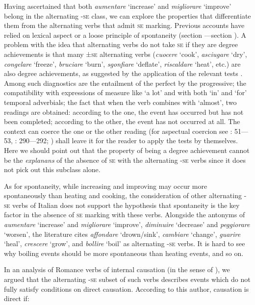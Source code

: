 \documentclass[output=paper,colorlinks,citecolor=brown
]{langscibook}
\begin{document}
Having ascertained that both \textit{aumentare} ‘increase’ and \textit{migliorare} ‘improve’ belong in the alternating -\textsc{se} class, we can explore the properties that differentiate them from the alternating verbs that admit \textsc{se} marking. Previous accounts have relied on lexical aspect or a loose principle of spontaneity (section —section ). A problem with the idea that alternating verbs do not take \textsc{se} if they are degree achievements is that many ±\textsc{se} alternating verbs (\textit{cuocere} ‘cook’, \textit{asciugare} ‘dry’, \textit{congelare} ‘freeze’, \textit{bruciare} ‘burn’, \textit{sgonfiare} ‘deflate’, \textit{riscaldare} ‘heat’, etc.) are also degree achievements, as suggested by the application of the relevant tests \citep{dowty1979word,bertinetto1995attempt,hay1999scalar}. Among such diagnostics are the entailment of the perfect by the progressive; the compatibility with expressions of measure like ‘a lot’ and with both ‘in’ and ‘for’ temporal adverbials; the fact that when the verb combines with ‘almost’, two readings are obtained: according to the one, the event has occurred but has not been completed; according to the other, the event has not occurred at all. The context can coerce the one or the other reading (for aspectual coercion see \cite{jackendoff1997architecture}: 51—53, \cite{jackendoff2002foundations}: 290—292; \cite{pustejovsky1991syntax}) shall leave it for the reader to apply the tests by themselves. Here we should point out that the property of being a degree achievement cannot be the \textit{explanans} of the absence of \textsc{se} with the alternating -\textsc{se} verbs since it does not pick out this subclass alone. 

As for spontaneity, while increasing and improving may occur more spontaneously than heating and cooking, the consideration of other alternating -\textsc{se} verbs of Italian does not support the hypothesis that spontaneity is the key factor in the absence of \textsc{se} marking with these verbs. Alongside the antonyms of \textit{aumentare} ‘increase’ and \textit{migliorare} ‘improve’, \textit{diminuire} ‘decrease’ and \textit{peggiorare} ‘worsen’, the literature cites \textit{affondare} ‘drown/sink’, \textit{cambiare} ‘change’, \textit{guarire} ‘heal’, \textit{crescere} ‘grow’, and \textit{bollire} ‘boil’ as alternating -\textsc{se} verbs. It is hard to see why boiling events should be more spontaneous than heating events, and so on.

In an analysis of Romance verbs of internal causation (in the sense of \cite{levin1995unaccusativity}), we argued that the alternating -\textsc{se} subset of such verbs describes events which do not fully satisfy \citet[4—5]{wolff2003direct} conditions on direct causation. According to this author, causation is direct if:
\end{document}
